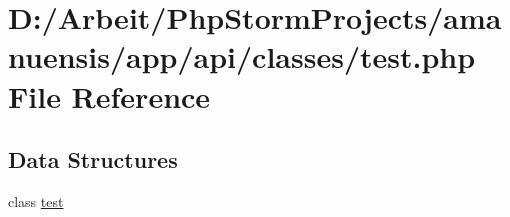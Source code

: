 \hypertarget{test_8php}{}\section{D\+:/\+Arbeit/\+Php\+Storm\+Projects/amanuensis/app/api/classes/test.php File Reference}
\label{test_8php}
\subsection*{Data Structures}
\begin{DoxyCompactItemize}
\item 
class \hyperlink{classtest}{test}
\end{DoxyCompactItemize}
